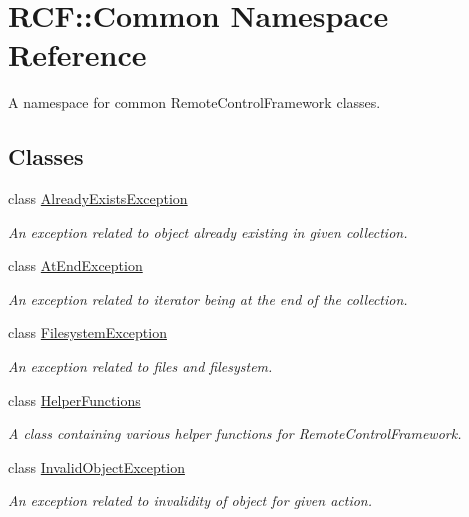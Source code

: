\hypertarget{namespace_r_c_f_1_1_common}{}\section{R\+C\+F\+:\+:Common Namespace Reference}
\label{namespace_r_c_f_1_1_common}


A namespace for common Remote\+Control\+Framework classes.  


\subsection*{Classes}
\begin{DoxyCompactItemize}
\item 
class \hyperlink{class_r_c_f_1_1_common_1_1_already_exists_exception}{Already\+Exists\+Exception}
\begin{DoxyCompactList}\small\item\em An exception related to object already existing in given collection. \end{DoxyCompactList}\item 
class \hyperlink{class_r_c_f_1_1_common_1_1_at_end_exception}{At\+End\+Exception}
\begin{DoxyCompactList}\small\item\em An exception related to iterator being at the end of the collection. \end{DoxyCompactList}\item 
class \hyperlink{class_r_c_f_1_1_common_1_1_filesystem_exception}{Filesystem\+Exception}
\begin{DoxyCompactList}\small\item\em An exception related to files and filesystem. \end{DoxyCompactList}\item 
class \hyperlink{class_r_c_f_1_1_common_1_1_helper_functions}{Helper\+Functions}
\begin{DoxyCompactList}\small\item\em A class containing various helper functions for Remote\+Control\+Framework. \end{DoxyCompactList}\item 
class \hyperlink{class_r_c_f_1_1_common_1_1_invalid_object_exception}{Invalid\+Object\+Exception}
\begin{DoxyCompactList}\small\item\em An exception related to invalidity of object for given action. \end{DoxyCompactList}\item 

\end{DoxyCompactItemize}
